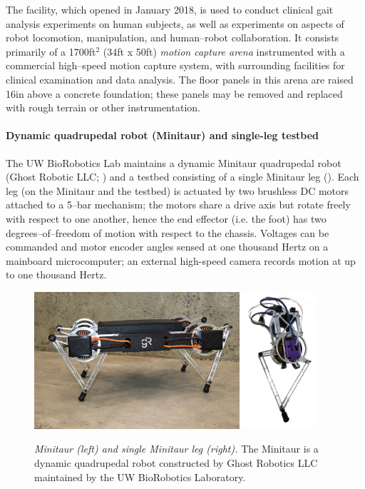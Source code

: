 \documentclass[11pt]{article}
\begin{document}
The facility, which opened in January 2018, is used to conduct clinical gait analysis experiments on human subjects, as well as experiments on aspects of robot locomotion, manipulation, and human--robot collaboration.
It consists primarily of a \num{1700}ft$^2$ (34ft x 50ft) \emph{motion capture arena} instrumented with a commercial high--speed motion capture system, with surrounding facilities for clinical examination and data analysis.
The floor panels in this arena are raised 16in above a concrete foundation; these panels may be removed and replaced with rough terrain or other instrumentation.

\paragraph{Dynamic quadrupedal robot (Minitaur) and single-leg testbed}
The UW BioRobotics Lab maintains a dynamic Minitaur quadrupedal robot (Ghost Robotic LLC; )
and
a testbed consisting of a single Minitaur leg ().
Each leg (on the Minitaur and the testbed) is actuated by two brushless DC motors attached to a 5--bar mechanism; the motors share a drive axis but rotate freely with respect to one another, hence the end effector (i.e. the foot) has two degrees--of--freedom of motion with respect to the chassis.
Voltages can be commanded and motor encoder angles sensed at one thousand Hertz on a mainboard microcomputer; an external high-speed camera records motion at up to one thousand Hertz.

\begin{figure}[h!]
\vspace{0.1cm}
{
\centering
\sf
\hfill
\includegraphics[height=2in]{minitaur.jpeg}
\hfill
\includegraphics[height=2in]{hopper_real.png}
\hfill
}
\caption{\label{fig:minitaur}
\emph{Minitaur ({left}) and single Minitaur leg ({right}).}
The Minitaur is a dynamic quadrupedal robot constructed by Ghost Robotics LLC maintained by the UW BioRobotics Laboratory.
}
\end{figure}
\end{document}
